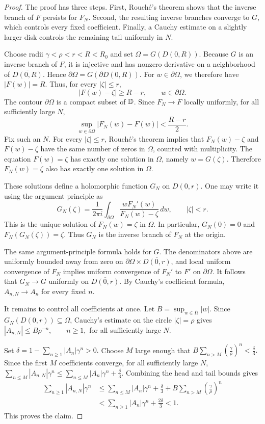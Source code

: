 \begin{proof}
The proof has three steps. First, Rouch\'e's theorem shows that the inverse
branch of $F$ persists for $F_N$. Second, the resulting inverse branches
converge to $G$, which controls every fixed coefficient. Finally, a Cauchy
estimate on a slightly larger disk controls the remaining tail uniformly in
$N$.

Choose radii
\(
\gamma<\rho<r<R<R_0
\)
and set
\(
\Omega=G(D(0,R)).
\)
Because $G$ is an inverse branch of $F$, it is injective and has nonzero
derivative on a neighborhood of $\overline{D(0,R)}$. Hence
\(
\partial\Omega=G(\partial D(0,R)).
\)
For $w\in\partial\Omega$, we therefore have $|F(w)|=R$. Thus, for every
$|\zeta|\leq r$,
\[
|F(w)-\zeta|\geq R-r,
\qquad w\in\partial\Omega.
\]
The contour $\partial\Omega$ is a compact subset of $\mathbb D$. Since
$F_N\to F$ locally uniformly, for all sufficiently large $N$,
\[
\sup_{w\in\partial\Omega}|F_N(w)-F(w)|<\frac{R-r}{2}.
\]
Fix such an $N$. For every $|\zeta|\leq r$, Rouch\'e's theorem implies that
$F_N(w)-\zeta$ and $F(w)-\zeta$ have the same number of zeros in $\Omega$,
counted with multiplicity. The equation $F(w)=\zeta$ has exactly one
solution in $\Omega$, namely $w=G(\zeta)$. Therefore $F_N(w)=\zeta$ also has
exactly one solution in $\Omega$.

These solutions define a holomorphic function $G_N$ on $D(0,r)$. One may
write it using the argument principle as
\[
G_N(\zeta)
=
\frac{1}{2\pi i}
\int_{\partial\Omega}
\frac{wF_N'(w)}{F_N(w)-\zeta}\,dw,
\qquad |\zeta|<r.
\]
This is the unique solution of $F_N(w)=\zeta$ in $\Omega$. In particular,
$G_N(0)=0$ and
\(
F_N(G_N(\zeta))=\zeta.
\)
Thus $G_N$ is the inverse branch of $F_N$ at the origin.

The same argument-principle formula holds for $G$. The denominators above
are uniformly bounded away from zero on
$\partial\Omega\times\overline{D(0,r)}$, and local uniform convergence of
$F_N$ implies uniform convergence of $F_N'$ to $F'$ on $\partial\Omega$.
It follows that
\(
G_N\longrightarrow G
\)
uniformly on $\overline{D(0,r)}$. By Cauchy's coefficient formula,
\(
A_{n,N}\longrightarrow A_n
\)
for every fixed $n$.

It remains to control all coefficients at once. Let
\(
B=\sup_{w\in\overline\Omega}|w|.
\)
Since $G_N(D(0,r))\subseteq\Omega$, Cauchy's estimate on the circle
$|\zeta|=\rho$ gives
\(
|A_{n,N}|\leq B\rho^{-n},
\qquad n\geq 1,
\)
for all sufficiently large $N$.

Set
\(
\delta
=
1-\sum_{n\geq 1}|A_n|\gamma^n
>0.
\)
Choose $M$ large enough that
\(
B\sum_{n>M}\left(\frac{\gamma}{\rho}\right)^n
<\frac{\delta}{3}.
\)
Since the first $M$ coefficients converge, for all sufficiently large $N$,
\(
\sum_{n\leq M}|A_{n,N}|\gamma^n
\leq
\sum_{n\leq M}|A_n|\gamma^n
+
\frac{\delta}{3}.
\)
Combining the head and tail bounds gives
\begin{align*}
\sum_{n\geq 1}|A_{n,N}|\gamma^n
&\leq
\sum_{n\leq M}|A_n|\gamma^n
+
\frac{\delta}{3}
+
B\sum_{n>M}\left(\frac{\gamma}{\rho}\right)^n \\
&<
\sum_{n\geq 1}|A_n|\gamma^n
+
\frac{2\delta}{3}
<1.
\end{align*}
This proves the claim.
\end{proof}
